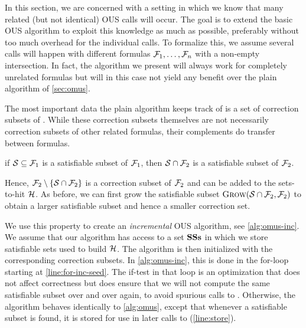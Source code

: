 \newcommand\satsets{\mm{\mathbf{SSs}}}
\newcommand\fall{\mm{\formula_{\mathit{all}}}}
In this section, we are concerned with a setting in which we know that many related (but not identical) OUS calls will occur. The goal is to extend the basic OUS algorithm to exploit this knowledge as much as possible, preferably without too much overhead for the individual calls. 
% 
To formalize this, we assume several \omus calls will happen with different formulas $\mathcal{F} _1,\dots,\mathcal{F} _n$ with a non-empty intersection. In fact, the algorithm we present will always work for completely unrelated formulas but will in this case not yield any benefit over the plain \omus algorithm of \cref{sec:omus}. 

The most important data the plain \omus algorithm keeps track of is a set  of correction subsets of \formula.
While these correction subsets themselves are not necessarily correction subsets of other related formulas, their complements do transfer between formulas.

\begin{proposition}\label{prop:ss}
if $\mathcal{S} \subseteq \mathcal{F} _1$ is a satisfiable subset of $\mathcal{F} _1$, then $\mathcal{S}\cap \mathcal{F} _2$ is a satisfiable subset of $\mathcal{F} _2$.
\end{proposition}
Hence, $\mathcal{F} _2 \setminus \{\mathcal{S}\cap \mathcal{F} _2\}$ is a correction subset of $\mathcal{F} _2$ and can be added to the sets-to-hit $\mathcal{H} $. As before, we can first grow the satisfiable subset $\textsc{Grow}(\mathcal{S}\cap \mathcal{F} _2,\mathcal{F} _2)$ to obtain a larger satisfiable subset and hence a smaller correction set.

We use this property to create an \textit{incremental} OUS algorithm, see \cref{alg:omus-inc}. We assume that our algorithm has access to a set $\satsets$ in which we store satisfiable sets used to build $\mathcal{H} $. The \omus algorithm is then initialized with the corresponding correction subsets. 
In  \cref{alg:omus-inc}, this is done in the for-loop starting at \cref{line:for-inc-seed}. The if-test in that loop is an optimization that does not affect correctness but does ensure that we will not compute the same satisfiable subset over and over again, to avoid spurious calls to \grow. 
Otherwise, the algorithm behaves identically to \cref{alg:omus}, except that whenever a satisfiable subset is found, it is stored for use in later calls to \omusinc (\cref{line:store}). 


